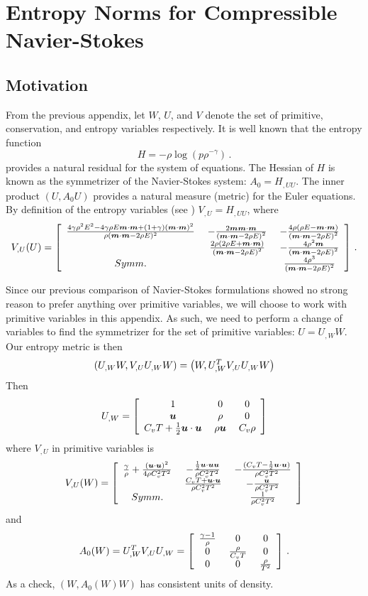\documentclass[Dissertation.tex]{subfiles}
\begin{document}
\chapter{Entropy Norms for Compressible Navier-Stokes}
\label{sec:EntropyNorm}
\section{Motivation}

From the previous appendix, let $W$, $U$, and $V$ denote the set of primitive, conservation, and
entropy variables respectively.
It is well known that the entropy function
\[
H=-\rho\log(p\rho^{-\gamma})\,.
\]
provides a natural residual for the system of equations.
The Hessian of $H$ is known as the symmetrizer of the Navier-Stokes system:
$A_0=H_{,UU}$.
The inner product $(U,A_0U)$ provides a 
natural measure (metric) for the Euler equations.
By definition of the entropy variables (see \cite{HughesEntropyVariables}) $V_{,U}=H_{,UU}$, where
\[
V_{,U}(U)=\left[ \begin{array}{ccc} \frac{4\gamma\rho^2E^2-4\gamma\rho E\boldsymbol m\cdot\boldsymbol m+(1+\gamma)(\boldsymbol m\cdot\boldsymbol m)^2}{\rho(\boldsymbol m\cdot\boldsymbol m-2\rho E)^2}\; & -\frac{2\boldsymbol m\boldsymbol m\cdot\boldsymbol m}{\left( \boldsymbol m\cdot\boldsymbol m-2\rho E \right)^2}\; & -\frac{4\rho(\rho E-\boldsymbol m\cdot\boldsymbol m)}{\left( \boldsymbol m\cdot\boldsymbol m-2\rho E \right)^2}\\ \; & \frac{2\rho(2\rho E+\boldsymbol m\cdot\boldsymbol m)}{\left( \boldsymbol m\cdot\boldsymbol m-2\rho E \right)^2}\; & -\frac{4\rho^2\boldsymbol m}{\left( \boldsymbol m\cdot\boldsymbol m-2\rho E \right)^2}\\ Symm.\; & \; & \frac{4\rho^3}{\left( \boldsymbol m\cdot\boldsymbol m-2\rho E \right)^2}\\ \end{array} \right]\,.
\]

Since our previous comparison of Navier-Stokes formulations showed no strong reason to 
prefer anything over primitive variables, we will choose to work with primitive variables 
in this appendix. 
As such, we need to perform a change of variables to find the symmetrizer for the set of primitive variables:
$U=U_{,W}W$.
Our entropy metric is then
\[
\left( U_{,W} W,V_{,U}U_{,W} W \right)=\left(  W,U_{,W}^TV_{,U}U_{,W} W \right)
\]
Then
\[
U_{,W}=\left[ \begin{array}{ccc} 1\; & 0\; & 0\\ \boldsymbol u\; & \rho\; & 0\\ C_vT+\frac{1}{2}\boldsymbol u\cdot\boldsymbol u\; & \rho\boldsymbol u\; & C_v\rho\\ \end{array} \right]
\]
where $V_{,U}$ in primitive variables is
\[
V_{,U}(W)=\left[ \begin{array}{ccc} \frac{\gamma}{\rho}+\frac{(\boldsymbol u\cdot\boldsymbol u)^2}{4\rho C_v^2 T^2}\; & -\frac{\frac{1}{2}\boldsymbol u\cdot\boldsymbol u\boldsymbol u}{\rho C_v^2 T^2}\; & -\frac{(C_v T-\frac{1}{2}\boldsymbol u\cdot\boldsymbol u)}{\rho C_v^2 T^2}\\ \; & \frac{C_v T+\boldsymbol u\cdot\boldsymbol u}{\rho C_v^2 T^2}\; & -\frac{\boldsymbol u}{\rho C_v^2 T^2}\\ Symm.\; & \; & \frac{1}{\rho C_v^2 T^2}\\ \end{array} \right]
\]
and
\[
A_0(W)=U_{,W}^TV_{,U}U_{,W}=\left[ \begin{array}{ccc} \frac{\gamma-1}{\rho}\; & 0\; & 0\\ 0\; & \frac{\rho}{C_v T}\; & 0\\ 0\; & 0\; & \frac{\rho}{T^2}\\ \end{array} \right]\,.
\]
As a check, $(W,A_0(W)W)$ has consistent units of density.
\end{document}
